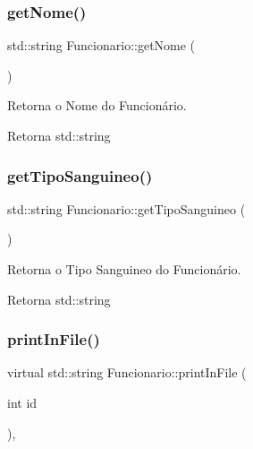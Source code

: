 \subsubsection{\texorpdfstring{get\+Nome()}{getNome()}}
{\footnotesize\ttfamily std\+::string Funcionario\+::get\+Nome (\begin{DoxyParamCaption}{ }\end{DoxyParamCaption})}



Retorna o Nome do Funcionário. 

\begin{DoxyReturn}{Retorna}
std\+::string 
\end{DoxyReturn}
\mbox{\label{classFuncionario_a871dfd5403d3d3c026c35b62ee2bb6a9}} 
\subsubsection{\texorpdfstring{get\+Tipo\+Sanguineo()}{getTipoSanguineo()}}
{\footnotesize\ttfamily std\+::string Funcionario\+::get\+Tipo\+Sanguineo (\begin{DoxyParamCaption}{ }\end{DoxyParamCaption})}



Retorna o Tipo Sanguineo do Funcionário. 

\begin{DoxyReturn}{Retorna}
std\+::string 
\end{DoxyReturn}
\mbox{\label{classFuncionario_a696332cf5ccde3a31f84e5af687e7ec2}} 
\subsubsection{\texorpdfstring{print\+In\+File()}{printInFile()}}
{\footnotesize\ttfamily virtual std\+::string Funcionario\+::print\+In\+File (\begin{DoxyParamCaption}\item[{int}]{id }\end{DoxyParamCaption})\hspace{0.3cm}{\ttfamily [protected]}, {}}



